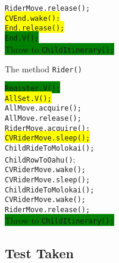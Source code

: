 \documentclass{article}
\begin{document}
\begin{spacing}{1.1}
\begin{algorithm}[bpth]
\begin{algorithmic}[1]
  \STATE \texttt{RiderMove.release();}\\
  \STATE \colorbox{yellow}{\texttt{CVEnd.wake();}}\\
  \STATE \colorbox{yellow}{\texttt{End.release();}}\\
  \STATE \colorbox{green}{\texttt{End.V();}}\\
  \vbox{\colorbox{green}{\vbox{
    \STATE Throw to \texttt{ChildItinerary();}\\
    \ENDIF
  }}}
  \RETURN
  \end{algorithmic}
\end{algorithm}

\begin{algorithm}[bpth]
  \caption{The method \texttt{Rider()}}
  \begin{algorithmic}[1]
  \STATE \colorbox{green}{\texttt{Register.V();}}\\
  \STATE \colorbox{yellow}{\texttt{AllSet.V();}}\\
  \STATE \texttt{AllMove.acquire();}\\
  \STATE \texttt{AllMove.release();}\\
  \STATE \texttt{RiderMove.acquire();}\\
  \STATE \colorbox{yellow}{\texttt{CVRiderMove.sleep();}}\\
  \STATE\texttt{ChildRideToMolokai();}\\
  \STATE\texttt{ChildRowToOahu()};\\
  \STATE\texttt{CVRiderMove.wake();}\\
  \STATE\texttt{CVRiderMove.sleep();}\\
  \ENDWHILE
  \STATE\texttt{ChildRideToMolokai();}\\
  \STATE\texttt{CVRiderMove.wake();}\\
  \STATE\texttt{RiderMove.release();}\\
  \vbox{\colorbox{green}{\vbox{
    \STATE Throw to \texttt{ChildItinerary();}\\
    \ENDIF
  }}}
  \RETURN
    
  \end{algorithmic}
\end{algorithm}

\subsection{Test Taken}

\end{spacing}
\end{document}
